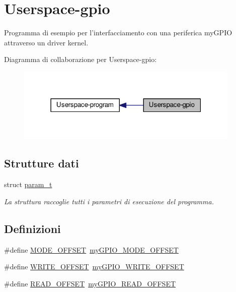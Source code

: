 \hypertarget{group__userspace-gpio}{\section{Userspace-\/gpio}
\label{group__userspace-gpio}
}


Programma di esempio per l'interfacciamento con una periferica my\+G\+P\+I\+O attraverso un driver kernel.  


Diagramma di collaborazione per Userspace-\/gpio\+:\nopagebreak
\begin{figure}[H]
\begin{center}
\leavevmode
\includegraphics[width=303pt]{group__userspace-gpio}
\end{center}
\end{figure}
\subsection*{Strutture dati}
\begin{DoxyCompactItemize}
\item 
struct \hyperlink{structparam__t}{param\+\_\+t}
\begin{DoxyCompactList}\small\item\em La struttura raccoglie tutti i parametri di esecuzione del programma. \end{DoxyCompactList}\end{DoxyCompactItemize}
\subsection*{Definizioni}
\begin{DoxyCompactItemize}
\item 
\#define \hyperlink{group__userspace-gpio_ga7a63b24ca5489eb3206598e3d90fe19c}{M\+O\+D\+E\+\_\+\+O\+F\+F\+S\+E\+T}~\hyperlink{group__my_g_p_i_o_ga81a662103d6ed053978c0a9b4c273065}{my\+G\+P\+I\+O\+\_\+\+M\+O\+D\+E\+\_\+\+O\+F\+F\+S\+E\+T}
\item 
\#define \hyperlink{group__userspace-gpio_ga77d96306ed0e813f93c4c3f98b970b86}{W\+R\+I\+T\+E\+\_\+\+O\+F\+F\+S\+E\+T}~\hyperlink{group__my_g_p_i_o_ga2e45778b6ca9ce6f5768b3f7a4557ce1}{my\+G\+P\+I\+O\+\_\+\+W\+R\+I\+T\+E\+\_\+\+O\+F\+F\+S\+E\+T}
\item 
\#define \hyperlink{group__userspace-gpio_gad32c3a5b42163e171daccde5b5d5de02}{R\+E\+A\+D\+\_\+\+O\+F\+F\+S\+E\+T}~\hyperlink{group__my_g_p_i_o_ga584d2dfece76e5762030d918d80592cc}{my\+G\+P\+I\+O\+\_\+\+R\+E\+A\+D\+\_\+\+O\+F\+F\+S\+E\+T}
\end{DoxyCompactItemize}
